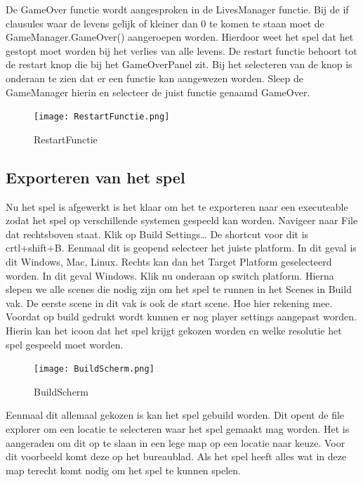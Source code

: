 De GameOver functie wordt aangesproken in de LivesManager functie. Bij de if clausules waar de levens gelijk of kleiner dan 0 te komen te staan moet de GameManager.GameOver() aangeroepen worden. Hierdoor weet het spel dat het gestopt moet worden bij het verlies van alle levens. 
De restart functie behoort tot de restart knop die bij het GameOverPanel zit. Bij het selecteren van de knop is onderaan te zien dat er een functie kan aangewezen worden. Sleep de GameManager hierin en selecteer de juist functie genaamd GameOver.

\begin{figure}[H]
    \centering
    \texttt{[image: RestartFunctie.png]}
    \caption{RestartFunctie}
    \label{fig:RestartFunctie}
\end{figure}

\subsection{ Exporteren van het spel}
Nu het spel is afgewerkt is het klaar om het te exporteren naar een executeable zodat het spel op verschillende systemen gespeeld kan worden. 
Navigeer naar File dat rechtsboven staat. Klik op Build Settings… De shortcut voor dit is crtl+shift+B. Eenmaal dit is geopend selecteer het juiste platform. In dit geval is dit Windows, Mac, Linux. Rechts kan dan het Target Platform geselecteerd worden. In dit geval Windows. Klik nu onderaan op switch platform. Hierna slepen we alle scenes die nodig zijn om het spel te runnen in het Scenes in Build vak. De eerste scene in dit vak is ook de start scene. Hoe hier rekening mee.
Voordat op build gedrukt wordt kunnen er nog player settings aangepast worden. Hierin kan het icoon dat het spel krijgt gekozen worden en welke resolutie het spel gespeeld moet worden.

\begin{figure}[H]
    \centering
    \texttt{[image: BuildScherm.png]}
    \caption{BuildScherm}
    \label{fig:BuildScherm}
\end{figure}
Eenmaal dit allemaal gekozen is kan het spel gebuild worden. Dit opent de file explorer om een locatie te selecteren waar het spel gemaakt mag worden. Het is aangeraden om dit op te slaan in een lege map op een locatie naar keuze. Voor dit voorbeeld komt deze op het bureaublad. Als het spel heeft alles wat in deze map terecht komt nodig om het spel te kunnen spelen.

